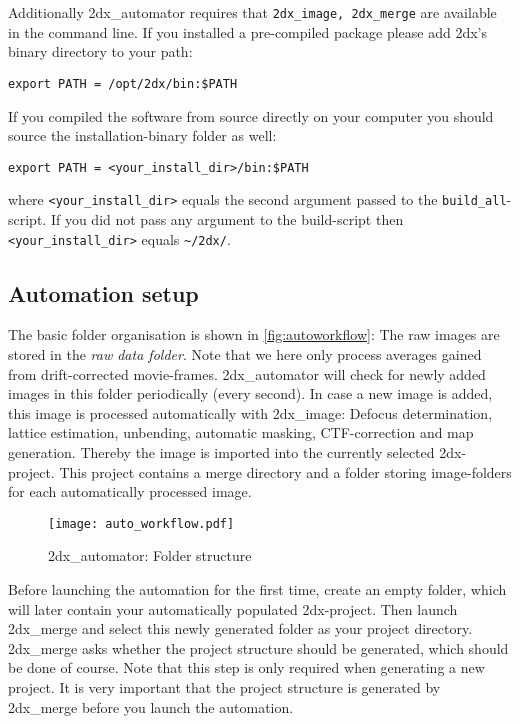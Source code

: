 Additionally 2dx\_automator requires that \texttt{2dx\_image, 2dx\_merge} are available in the command line. If you installed a pre-compiled package please add 2dx's binary directory to your path:

\texttt{export PATH = /opt/2dx/bin:\$PATH}

If you compiled the software from source directly on your computer you should source the installation-binary folder as well:

\texttt{export PATH = <your\_install\_dir>/bin:\$PATH}

where \texttt{<your\_install\_dir>} equals the second argument passed to the \texttt{build\_all}-script. If you did not pass any argument to the build-script then \texttt{<your\_install\_dir>} equals \texttt{\textasciitilde{}/2dx/}.

\subsection{Automation setup}

The basic folder organisation is shown in \autoref{fig:autoworkflow}: The raw images are stored in the \textit{raw data folder}. Note that we here only process averages gained from drift-corrected movie-frames. 2dx\_automator will check for newly added images in this folder periodically (every second). In case a new image is added, this image is processed automatically with 2dx\_image: Defocus determination, lattice estimation, unbending, automatic masking, CTF-correction and map generation. Thereby the image is imported into the currently selected 2dx-project. This project contains a merge directory and a folder storing image-folders for each automatically processed image.

\begin{figure}
	\centering
	\texttt{[image: auto\_workflow.pdf]}
	\caption{2dx\_automator: Folder structure}
	\label{fig:autoworkflow}
\end{figure}

Before launching the automation for the first time, create an empty folder, which will later contain your automatically populated 2dx-project. Then launch 2dx\_merge and select this newly generated folder as your project directory. 2dx\_merge asks whether the project structure should be generated, which should be done of course. Note that this step is only required when generating a new project. It is very important that the project structure is generated by 2dx\_merge before you launch the automation.

